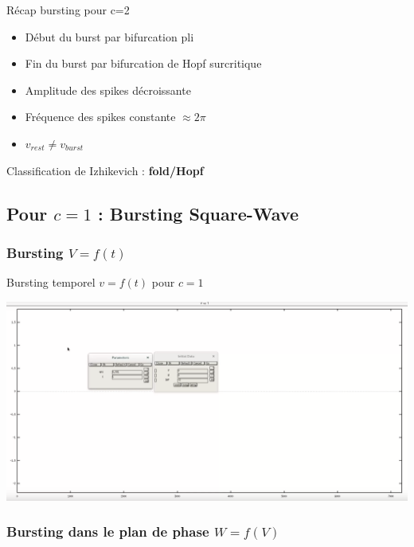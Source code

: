\documentclass[xcolor={dvipsnames},10pt]{beamer}
\begin{document}
\begin{frame}{Récap bursting pour c=2}
\begin{center}
\begin{itemize}
\item Début du burst par bifurcation pli
\item Fin du burst par bifurcation de Hopf surcritique
\item Amplitude des spikes décroissante
\item Fréquence des spikes constante $\approx 2\pi$
\item $v_{rest} \ne v_{burst}$
\end{itemize}
\vspace{1cm}
Classification de Izhikevich : \textbf{fold/Hopf}
\end{center}
\end{frame}

\subsection{Pour \texorpdfstring{$c = 1$}{Lg} : Bursting Square-Wave}

\subsubsection*{Bursting \texorpdfstring{$V=f(t)$}{Lg}}

\begin{frame}{Bursting temporel $v=f(t)$ pour $c = 1$}
\begin{center}
\href{https://drive.google.com/open?id=0ByPBcq8q0ou_cmtOazZJZFFIN2M}{\includegraphics[width =  1.0\textwidth]{Burst_c_1_temp}}
\end{center}
\end{frame}

\subsubsection*{Bursting dans le plan de phase \texorpdfstring{$W=f(V)$}{Lg}}
\end{document}
